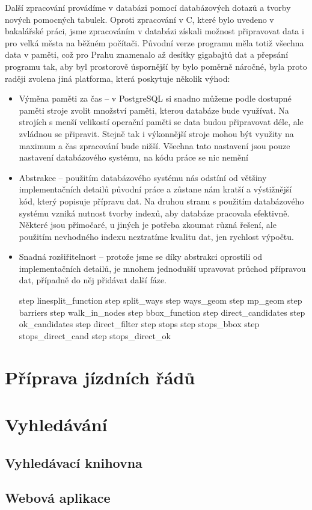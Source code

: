 Další zpracování provádíme v databázi pomocí databázových dotazů a tvorby nových pomocných tabulek. Oproti zpracování v C, které bylo uvedeno v bakalářské práci, jsme zpracováním v databázi získali možnost připravovat data i pro velká města na běžném počítači. Původní verze programu měla totiž všechna data v paměti, což pro Prahu znamenalo až desítky gigabajtů dat a přepsání programu tak, aby byl prostorově úspornější by bylo poměrně náročné, byla proto raději zvolena jiná platforma, která poskytuje několik výhod:
\begin{itemize}
	\item Výměna paměti za čas -- v PostgreSQL si snadno můžeme podle dostupné paměti stroje zvolit množství paměti, kterou databáze bude využívat. Na strojích s menší velikostí operační paměti se data budou připravovat déle, ale zvládnou se připravit. Stejně tak i výkonnější stroje mohou být využity na maximum a čas zpracování bude nižší. Všechna tato nastavení jsou pouze nastavení databázového systému, na kódu práce se nic nemění
	\item Abstrakce -- použitím databázového systému nás odstíní od většiny implementačních detailů původní práce a zůstane nám kratší a výstižnější kód, který popisuje přípravu dat. Na druhou stranu s použitím databázového systému vzniká nutnost tvorby indexů, aby databáze pracovala efektivně. Některé jsou přímočaré, u jiných je potřeba zkoumat různá řešení, ale použitím nevhodného indexu neztratíme kvalitu dat, jen rychlost výpočtu. 
	\item Snadná rozšiřitelnost -- protože jsme se díky abstrakci oprostili od implementačních detailů, je mnohem jednodušší upravovat průchod přípravou dat, případně do něj přidávat další fáze.

 
step linesplit_function
step split_ways 
step ways_geom
step mp_geom
step barriers
step walk_in_nodes
step bbox_function
step direct_candidates
step ok_candidates
step direct_filter
step stops
step stops_bbox
step stops_direct_cand
step stops_direct_ok

\end{itemize}
\section{Příprava jízdních řádů}
\section{Vyhledávání}
\subsection{Vyhledávací knihovna}
\subsection{Webová aplikace}
